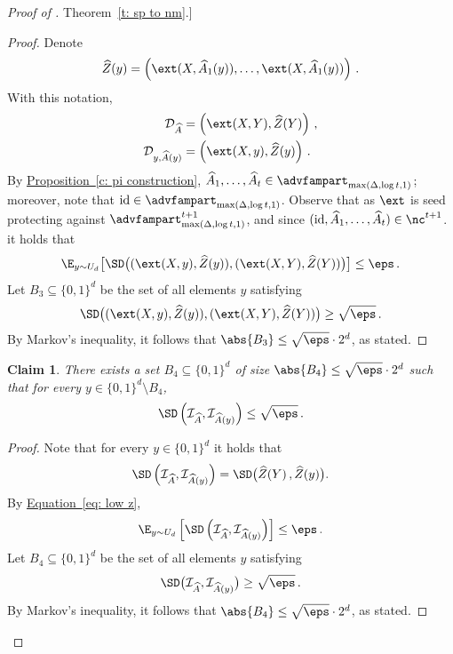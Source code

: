 \documentclass[11pt]{article}
\numberwithin{equation}{section}
\newtheorem{claim}[theorem]{Claim}
\theoremstyle{definition}
\theoremstyle{plain}
\newcommand{\expref}[2]{\hyperref[#2]{#1~\ref{#2}}}
\newcommand{\expeqref}[2]{\hyperref[#2]{#1~\eqref{#2}}}
\begin{document}
\begin{proof}[Proof of \expref{Theorem}{t: sp to nm}.]
\begin{proof}
	Denote 
	\begin{align*}
		\widehat{Z}(y) = \left(\ext(X,\widehat{A}_1(y)), \ldots, \ext(X,\widehat{A}_1(y))\right)\,.
	\end{align*}
	With this notation, 
	\begin{align*}
	\mathcal{D}_{\widehat{A}} &= \left( \ext(X,Y), \widehat{Z}(Y) \right)\,, \\
	\mathcal{D}_{y,\widehat{A}(y)} &= \left( \ext(X,y), \widehat{Z}(y) \right)\,.
	\end{align*}
%
	By \expref{Proposition}{c: pi construction}, $\widehat{A}_1,\ldots,\widehat{A}_t \in \advfampart_{\max(\Delta, \log t,1)}$; moreover, note that  $\mathrm{id} \in \advfampart_{\max(\Delta, \log t,1)}$. Observe that as $\ext$ is seed protecting against $\advfampart_{\max(\Delta, \log t,1)}^{t+1}$, and since $(\mathrm{id},\widehat{A}_1,\ldots,\widehat{A}_t) \in \nc^{t+1}$. it holds that %
	\begin{equation}\label{eq: low z}
	\E_{y\sim U_d}\big[\SD\big((\ext(X,y), \widehat{Z}(y)), (\ext(X,Y),\widehat{Z}(Y))\big)\big] \leq \eps\,.
	\end{equation}
	Let $B_3 \subseteq \{0,1\}^d$ be the set of all elements $y$ satisfying
	\begin{align*}
	\SD\big((\ext(X,y), \widehat{Z}(y)),(\ext(X,Y), \widehat{Z}(Y))\big) \geq \sqrt{\eps}\,.
	\end{align*}
	By Markov's inequality, it follows that $\abs{B_3} \leq \sqrt{\eps}\cdot 2^d$, as stated.
%
	
\end{proof}

\begin{claim}\label{claim:i is concentrated}
	There exists a set
	 $B_4 \subseteq \{0,1\}^d$ of size $\abs{B_4} \le \sqrt{\eps} \cdot 2^d$ such that for every $y \in \{0,1\}^d \setminus B_4$,
	\[
	\SD\left(\mathcal{I}_{\widehat{A}}, \mathcal{I}_{\widehat{A}(y)}\right) \le \sqrt{\eps}\,.
	\]
\end{claim}
\begin{proof}
	Note that for every $y \in \{0,1\}^d$ it holds that  
	\[
	\SD\left(\mathcal{I}_{\widehat{A}}, \mathcal{I}_{\widehat{A}(y)}\right) = \SD\big(\widehat{Z}(Y)\,, \widehat{Z}(y)\big).
	\]
	By \expeqref{Equation}{eq: low z},
	\[
	\E_{y\sim U_d}\left[\SD\left(\mathcal{I}_{\widehat{A}}, \mathcal{I}_{\widehat{A}(y)}\right)\right] \leq \eps\,.  
	\]
	Let $B_4 \subseteq \{0,1\}^d$ be the set of all elements $y$ satisfying
	\begin{align*}
	\SD\big(\mathcal{I}_{\widehat{A}}, \mathcal{I}_{\widehat{A}(y)}\big) \geq \sqrt{\eps}\,.
	\end{align*}
	By Markov's inequality, it follows that $\abs{B_4} \leq \sqrt{\eps}\cdot 2^d$, as stated.
\end{proof}



\end{proof}
\end{document}

